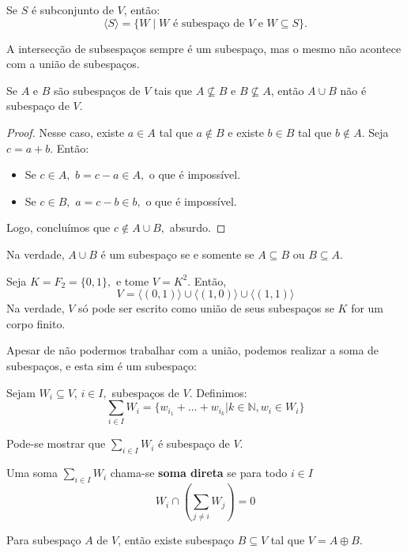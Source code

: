 \documentclass[11pt,twoside,a4paper]{book}
\begin{document}
\begin{proposicao}
Se $S$ é subconjunto de $V$, então:
\[
\langle S\rangle=\{W\mid W\text{ é subespaço de }V\text{ e }W\subseteq S\}.
\]
\end{proposicao}
A intersecção de subsespaços sempre é um subespaço, mas o mesmo não acontece com a união de subespaços.
\begin{proposicao}
Se $A$ e $B$ são subespaços de $V$ tais que $A\nsubseteq B$ e $B\nsubseteq A$, então $A\cup B$ não é subespaço de $V$.
\end{proposicao}
\begin{proof}
Nesse caso, existe $a\in A$ tal que $a\notin B$ e existe $b\in B$ tal que $b\notin A$. Seja $c=a+b$. Então:
\begin{itemize}
    \item Se $c \in A,$ $b = c - a \in A,$ o que é impossível.
    \item Se $c \in B,$ $a = c - b \in b,$ o que é impossível.
\end{itemize}
Logo, concluímos que $c \notin A \cup B,$ absurdo.

\end{proof}

Na verdade, $A \cup B$ é um subespaço se e somente se $A \subseteq B$ ou $B \subseteq A.$

\begin{observacao}
Seja $K = F_2 = \{ 0, 1 \},$ e tome $V = K^2.$ Então,
\[
V = \langle (0,1) \rangle \cup \langle (1,0) \rangle \cup \langle (1,1) \rangle
\]
Na verdade, $V$ só pode ser escrito como união de seus subespaços se $K$ for um corpo finito.
\end{observacao}

Apesar de não podermos trabalhar com a união, podemos realizar a soma de subespaços, e esta sim é um subespaço:

\begin{definicao}
Sejam $W_i \subseteq V$, $i \in I,$ subespaços de $V.$ Definimos:
\[
\sum\limits_{i \in I} W_i = \{ w_{i_1} + \ldots + w_{i_k} | k \in \mathbb{N}, w_i \in W_i \}
\]
\end{definicao}
Pode-se mostrar que $\sum\limits_{i \in I} W_i $ é subespaço de $V$.
\begin{definicao}
Uma soma $\sum\limits_{i \in I} W_i$ chama-se \textbf{soma direta} se para todo $i \in I$
\[
W_i \cap \left( \sum\limits_{j \neq i} W_j \right) = 0
\]
\end{definicao}
\begin{teorema}
Para subespaço $A$ de $V$, então existe subespaço $B\subseteq V$ tal que $V=A\oplus B$.
\end{teorema}
\end{document}
